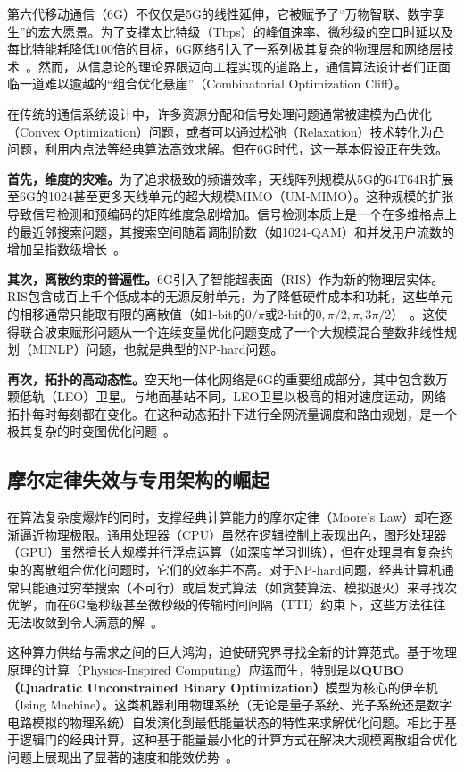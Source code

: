 \documentclass[12pt,a4paper]{article}
\begin{document}
第六代移动通信（6G）不仅仅是5G的线性延伸，它被赋予了``万物智联、数字孪生''的宏大愿景。为了支撑太比特级（Tbps）的峰值速率、微秒级的空口时延以及每比特能耗降低100倍的目标，6G网络引入了一系列极其复杂的物理层和网络层技术~\cite{ref1}。然而，从信息论的理论界限迈向工程实现的道路上，通信算法设计者们正面临一道难以逾越的``组合优化悬崖''（Combinatorial Optimization Cliff）。

在传统的通信系统设计中，许多资源分配和信号处理问题通常被建模为凸优化（Convex Optimization）问题，或者可以通过松弛（Relaxation）技术转化为凸问题，利用内点法等经典算法高效求解。但在6G时代，这一基本假设正在失效。

\textbf{首先，维度的灾难。}为了追求极致的频谱效率，天线阵列规模从5G的64T64R扩展至6G的1024甚至更多天线单元的超大规模MIMO（UM-MIMO）。这种规模的扩张导致信号检测和预编码的矩阵维度急剧增加。信号检测本质上是一个在多维格点上的最近邻搜索问题，其搜索空间随着调制阶数（如1024-QAM）和并发用户流数的增加呈指数级增长~\cite{ref4}。

\textbf{其次，离散约束的普遍性。}6G引入了智能超表面（RIS）作为新的物理层实体。RIS包含成百上千个低成本的无源反射单元，为了降低硬件成本和功耗，这些单元的相移通常只能取有限的离散值（如1-bit的$0/\pi$或2-bit的$0, \pi/2, \pi, 3\pi/2$）~\cite{ref7}。这使得联合波束赋形问题从一个连续变量优化问题变成了一个大规模混合整数非线性规划（MINLP）问题，也就是典型的NP-hard问题。

\textbf{再次，拓扑的高动态性。}空天地一体化网络是6G的重要组成部分，其中包含数万颗低轨（LEO）卫星。与地面基站不同，LEO卫星以极高的相对速度运动，网络拓扑每时每刻都在变化。在这种动态拓扑下进行全网流量调度和路由规划，是一个极其复杂的时变图优化问题~\cite{ref9}。

\subsection{摩尔定律失效与专用架构的崛起}

在算法复杂度爆炸的同时，支撑经典计算能力的摩尔定律（Moore's Law）却在逐渐逼近物理极限。通用处理器（CPU）虽然在逻辑控制上表现出色，图形处理器（GPU）虽然擅长大规模并行浮点运算（如深度学习训练），但在处理具有复杂约束的离散组合优化问题时，它们的效率并不高。对于NP-hard问题，经典计算机通常只能通过穷举搜索（不可行）或启发式算法（如贪婪算法、模拟退火）来寻找次优解，而在6G毫秒级甚至微秒级的传输时间间隔（TTI）约束下，这些方法往往无法收敛到令人满意的解~\cite{ref11}。

这种算力供给与需求之间的巨大鸿沟，迫使研究界寻找全新的计算范式。基于物理原理的计算（Physics-Inspired Computing）应运而生，特别是以\textbf{QUBO（Quadratic Unconstrained Binary Optimization）}模型为核心的伊辛机（Ising Machine）。这类机器利用物理系统（无论是量子系统、光子系统还是数字电路模拟的物理系统）自发演化到最低能量状态的特性来求解优化问题。相比于基于逻辑门的经典计算，这种基于能量最小化的计算方式在解决大规模离散组合优化问题上展现出了显著的速度和能效优势~\cite{ref2}。
\end{document}
